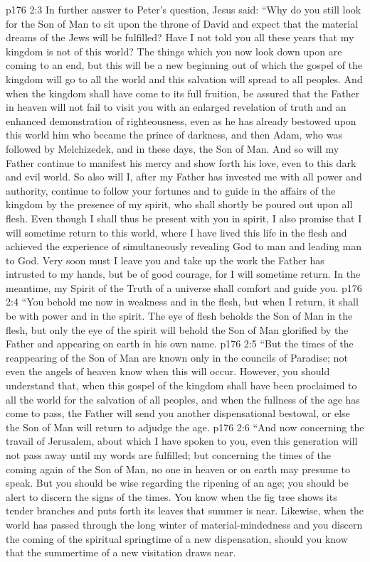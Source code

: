 \pc \vs p176 2:3 In further answer to Peter’s question, Jesus said: \textcolor{ubdarkred}{“Why do you still look for the Son of Man to sit upon the throne of David and expect that the material dreams of the Jews will be fulfilled? Have I not told you all these years that my kingdom is not of this world? The things which you now look down upon are coming to an end, but this will be a new beginning out of which the gospel of the kingdom will go to all the world and this salvation will spread to all peoples. And when the kingdom shall have come to its full fruition, be assured that the Father in heaven will not fail to visit you with an enlarged revelation of truth and an enhanced demonstration of righteousness, even as he has already bestowed upon this world him who became the prince of darkness, and then Adam, who was followed by Melchizedek, and in these days, the Son of Man. And so will my Father continue to manifest his mercy and show forth his love, even to this dark and evil world. So also will I, after my Father has invested me with all power and authority, continue to follow your fortunes and to guide in the affairs of the kingdom by the presence of my spirit, who shall shortly be poured out upon all flesh. Even though I shall thus be present with you in spirit, I also promise that I will sometime return to this world, where I have lived this life in the flesh and achieved the experience of simultaneously revealing God to man and leading man to God. Very soon must I leave you and take up the work the Father has intrusted to my hands, but be of good courage, for I will sometime return. In the meantime, my Spirit of the Truth of a universe shall comfort and guide you.}
\vs p176 2:4 \textcolor{ubdarkred}{“You behold me now in weakness and in the flesh, but when I return, it shall be with power and in the spirit. The eye of flesh beholds the Son of Man in the flesh, but only the eye of the spirit will behold the Son of Man glorified by the Father and appearing on earth in his own name.}
\vs p176 2:5 \textcolor{ubdarkred}{“But the times of the reappearing of the Son of Man are known only in the councils of Paradise; not even the angels of heaven know when this will occur. However, you should understand that, when this gospel of the kingdom shall have been proclaimed to all the world for the salvation of all peoples, and when the fullness of the age has come to pass, the Father will send you another dispensational bestowal, or else the Son of Man will return to adjudge the age.}
\vs p176 2:6 \textcolor{ubdarkred}{“And now concerning the travail of Jerusalem, about which I have spoken to you, even this generation will not pass away until my words are fulfilled; but concerning the times of the coming again of the Son of Man, no one in heaven or on earth may presume to speak. But you should be wise regarding the ripening of an age; you should be alert to discern the signs of the times. You know when the fig tree shows its tender branches and puts forth its leaves that summer is near. Likewise, when the world has passed through the long winter of material\hyp{}mindedness and you discern the coming of the spiritual springtime of a new dispensation, should you know that the summertime of a new visitation draws near.}\plusone
